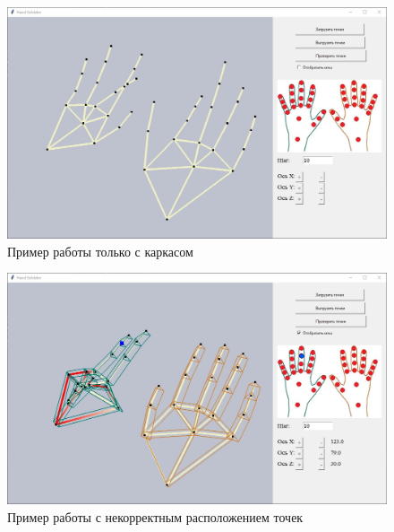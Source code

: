 \begin{figure}[ht!]
	\centering
	\includegraphics[scale=0.5]{example2.jpg}
	\caption{Пример работы только с каркасом}
	\label{fig:example2}
\end{figure}

\begin{figure}[ht!]
	\centering
	\includegraphics[scale=0.5]{example3.jpg}
	\caption{Пример работы с некорректным расположением точек}
	\label{fig:example3}
\end{figure}



